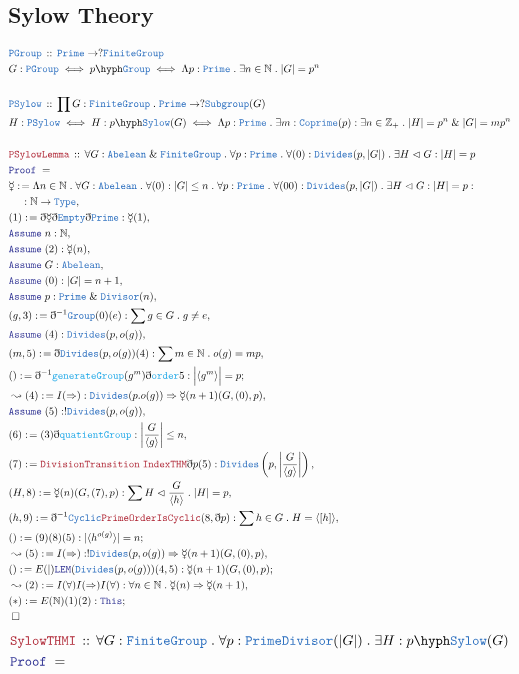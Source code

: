 \documentclass[12pt]{scrartcl}
\newcommand{\TYPE}[1]{\textcolor{NavyBlue}{\mathtt{#1}}}
\newcommand{\FUNC}[1]{\textcolor{Cerulean}{\mathtt{#1}}}
\newcommand{\LOGIC}[1]{\textcolor{Blue}{\mathtt{#1}}}
\newcommand{\THM}[1]{\textcolor{Maroon}{\mathtt{#1}}}
\renewcommand{\.}{\; . \;}
\newcommand{\de}{: \kern 0.1pc =}
\newcommand{\Theorem}[2]{& \THM{#1} \, :: \, #2 \\ & \Proof = \\ }
\newcommand{\DeclareType}[2]{& \TYPE{#1} \, :: \, #2 \\}
\newcommand{\DefineNamedType}[4]{& #1 : \TYPE{#2} \iff #3 \iff #4 \\}
\newcommand{\NewLine}{\\ & \kern 1pc}
\newcommand{\Page}[1]{ \begin{align*} #1 \end{align*}   }
\newcommand{ \bd }{ \ByDef }
\renewcommand{\And}{\; \& \;}
\newcommand{\Type}{\TYPE{Type}}
\newcommand{\NNInt}{\mathbb{Z}_{+} }
\newcommand{\Nat}{\mathbb{N} }
\newcommand{\Say}[3]{& #1 \de #2 : #3, \\}
\newcommand{\Conclude}[3]{& #1 \de #2 : #3; \\}
\newcommand{\Derive}[3]{& \leadsto #1 \de #2 : #3, \\}
\newcommand{\Assume}[2]{& \LOGIC{Assume} \; #1 : #2, \\}
\newcommand{\QED}{\; \square}
\newcommand{\EndProof}{& \QED \\}
\newcommand{\ByDef}{\eth}
\newcommand{\Proof}{\LOGIC{Proof} \; }
\newcommand{\Group}{\TYPE{Group}}
\newcommand{\Abel}{\TYPE{Abelean}}
\newcommand{\Nrml}{\vartriangleleft}
\newcommand{\FG}{\TYPE{FiniteGroup}}
\begin{document}
\subsection{Sylow Theory}
\Page{
	\DeclareType{PGroup}{ \TYPE{Prime} \to ?\FG    }
	\DefineNamedType{G}{PGroup}{p\hyph\Group}{\Lambda p : \TYPE{Prime} \. \exists n \in \Nat \. |G| = p^n}
	\\
	\DeclareType{PSylow}{\prod G : \FG \. \TYPE{Prime} \to ?\TYPE{Subgroup}(G)}
	\DefineNamedType{H}{PSylow}{H : p\hyph\TYPE{Sylow}(G)}{\Lambda p : \TYPE{Prime} \.
		\exists m : \TYPE{Coprime}(p) : \exists n \in \NNInt \. |H| = p^n \And |G| = mp^n }
	\\
	\Theorem{PSylowLemma}{\forall G : \Abel \And \FG \. \forall p : \TYPE{Prime} \. \forall (0) : \TYPE{Divides}(p,|G|)
		 \. \exists H \Nrml G : |H| = p
	}
	\Say{\mercury}{\Lambda n \in \Nat \. \forall G : \Abel \. \forall (0) : |G| \le n \. 
		\forall p : \TYPE{Prime} \. \forall (00) : \TYPE{Divides}(p,|G|) \. \exists H \Nrml G : |H| = p  }
	{ \NewLine : \Nat \to \Type} 
	\Say{(1)}{\bd \mercury \bd \TYPE{Empty} \bd \TYPE{Prime}}{\mercury(1)}
	\Assume{n}{\Nat}
	\Assume{(2)}{\mercury(n)}
	\Assume{G}{\Abel}
	\Assume{(0)}{|G| = n + 1 }
	\Assume{p}{\TYPE{Prime} \And \TYPE{Divisor}(n)}
	\Say{(g,3)}{\bd^{-1} \TYPE{Group}(0)(e)}{\sum g \in G \. g \neq e}
	\Assume{(4)}{\TYPE{Divides}(p,o(g))}
	\Say{(m,5)}{\bd \TYPE{Divides}(p,o(g))(4)}{\sum m \in \Nat \. o(g) = mp}
	\Conclude{()}{ \bd^{-1}\FUNC{generateGroup}(g^m)\bd \FUNC{order} 5}{\Big| \langle g^m \rangle \Big| = p}
	\Derive{(4)}{I(\Rightarrow)}{\TYPE{Divides}(p.o(g)) \Rightarrow \mercury(n + 1)(G,(0),p) }
	\Assume{(5)}{!\TYPE{Divides}(p,o(g))}
	\Say{(6)}{(3)\bd\FUNC{quatientGroup}}{ \left| \frac{G}{\langle g \rangle}   \right| \le n }
	\Say{(7)}{\THM{DivisionTransition} \; \THM{IndexTHM}{\bd p}(5)}
	{\TYPE{Divides}\left(p, \left| \frac{G}{\langle g \rangle} \right| \right)}
	\Say{(H,8)}{\mercury(n)(G,(7),p)}{\sum H \Nrml \frac{G}{\langle h \rangle} \. |H| = p}
	\Say{(h,9)}{ \bd^{-1} \TYPE{Cyclic}\THM{PrimeOrderIsCyclic}(8,\bd p)}
	{\sum h \in G \. H = \langle [h] \rangle}
	\Conclude{()}{(9)(8)(5)}{|\langle h^{o(g)} \rangle| = n}
	\Derive{(5)}{I(\Rightarrow)}{!\TYPE{Divides}(p,o(g)) \Rightarrow \mercury(n + 1)(G,(0),p) }
	\Conclude{()}{E(|)\LOGIC{LEM}(\TYPE{Divides}(p,o(g)))(4,5)}{ \mercury(n + 1)(G,(0),p) }
	\Derive{(2)}{I(\forall)I(\Rightarrow)I(\forall)}{ \forall n \in \Nat \. \mercury(n) \Rightarrow \mercury(n+1) }
	\Conclude{(*)}{E(\Nat)(1)(2)}{\LOGIC{This}}
	\EndProof
} \newpage \Page{
	\Theorem{SylowTHMI}{\forall G : \FG \. \forall p : \TYPE{PrimeDivisor}(|G|) \. \exists H : p\hyph\TYPE{Sylow}(G)}
}
\end{document}
